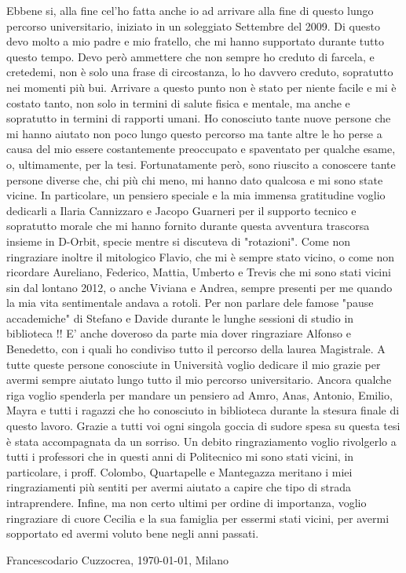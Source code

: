 Ebbene si, alla fine cel'ho fatta anche io ad arrivare alla fine di questo lungo percorso universitario, iniziato in un soleggiato Settembre del 2009. Di questo devo molto a mio padre e mio fratello, che mi hanno supportato durante tutto questo tempo. Devo però ammettere che non sempre ho creduto di farcela, e cretedemi, non è solo una frase di circostanza, lo ho davvero creduto, sopratutto nei momenti più bui. Arrivare a questo punto non è stato per niente facile e mi è costato tanto, non solo in termini di salute fisica e mentale, ma anche e sopratutto in termini di rapporti umani. Ho conosciuto tante nuove persone che mi hanno aiutato non poco lungo questo percorso ma tante altre le ho perse a causa del mio essere costantemente preoccupato e spaventato per qualche esame, o, ultimamente, per la tesi. Fortunatamente però, sono riuscito a conoscere tante persone diverse che, chi più chi meno, mi hanno dato qualcosa e mi sono state vicine. In particolare, un pensiero speciale e la mia immensa gratitudine voglio dedicarli a Ilaria Cannizzaro e Jacopo Guarneri per il supporto tecnico e sopratutto morale che mi hanno fornito durante questa avventura trascorsa insieme in D-Orbit, specie mentre si discuteva di "rotazioni". Come non ringraziare inoltre il mitologico Flavio, che mi è sempre stato vicino, o come non ricordare Aureliano, Federico, Mattia, Umberto e Trevis che mi sono stati vicini sin dal lontano 2012, o anche Viviana e Andrea, sempre presenti per me quando la mia vita sentimentale andava a rotoli. Per non parlare dele famose "pause accademiche" di Stefano e Davide durante le lunghe sessioni di studio in biblioteca !! E' anche doveroso da parte mia dover ringraziare Alfonso e Benedetto, con i quali ho condiviso tutto il percorso della laurea Magistrale. A tutte queste persone conosciute in Università voglio dedicare il mio grazie per avermi sempre aiutato lungo tutto il mio percorso universitario. Ancora qualche riga voglio spenderla per mandare un pensiero ad Amro, Anas, Antonio, Emilio, Mayra e tutti i ragazzi che ho conosciuto in biblioteca durante la stesura finale di questo lavoro. Grazie a tutti voi ogni singola goccia di sudore spesa su questa tesi è stata accompagnata da un sorriso. Un debito ringraziamento voglio rivolgerlo a tutti i professori che in questi anni di Politecnico mi sono stati vicini, in particolare, i proff. Colombo, Quartapelle e Mantegazza meritano i miei ringraziamenti più sentiti per avermi aiutato a capire che tipo di strada intraprendere. 
\newpage
Infine, ma non certo ultimi per ordine di importanza, voglio ringraziare di cuore Cecilia e la sua famiglia per essermi stati vicini, per avermi sopportato ed avermi voluto bene negli anni passati.

\vspace{2cm}

Francescodario Cuzzocrea, \today, Milano